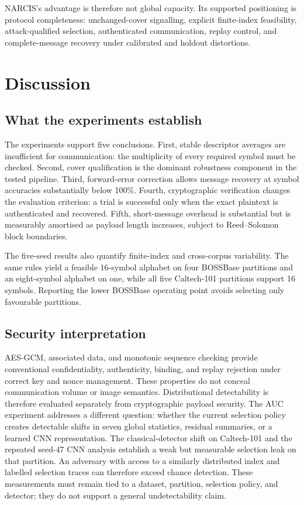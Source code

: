 ﻿\documentclass[a4paper,fleqn]{cas-dc}
\newcommand{\method}{NARCIS\xspace}
\begin{document}
\method's advantage is therefore not global capacity. Its supported
positioning is protocol completeness: unchanged-cover signalling, explicit
finite-index feasibility, attack-qualified selection, authenticated
communication, replay control, and complete-message recovery under calibrated
and holdout distortions.

\FloatBarrier
\section{Discussion}
\label{sec:discussion}

\subsection{What the experiments establish}

The experiments support five conclusions. First, stable descriptor averages
are insufficient for communication: the multiplicity of every required
symbol must be checked. Second, cover qualification is the dominant robustness
component in the tested pipeline. Third, forward-error correction allows
message recovery at symbol accuracies substantially below 100\%. Fourth,
cryptographic verification changes the evaluation criterion: a trial is
successful only when the exact plaintext is authenticated and recovered.
Fifth, short-message overhead is substantial but is measurably amortised as
payload length increases, subject to Reed--Solomon block boundaries.

The five-seed results also quantify finite-index and cross-corpus variability.
The same rules yield a feasible 16-symbol alphabet on four BOSSBase
partitions and an eight-symbol alphabet on one, while all five Caltech-101
partitions support 16 symbols. Reporting the lower BOSSBase operating point
avoids selecting only favourable partitions.

\subsection{Security interpretation}

AES-GCM, associated data, and monotonic sequence checking provide conventional
confidentiality, authenticity, binding, and replay rejection under correct key
and nonce management. These properties do not conceal communication volume or
image semantics. Distributional detectability is therefore evaluated
separately from cryptographic payload security. The AUC experiment addresses
a different question: whether
the current selection policy creates detectable shifts in seven global
statistics, residual summaries, or a learned CNN representation. The
classical-detector shift on Caltech-101 and the repeated seed-47 CNN analysis
establish a weak but measurable selection leak on that partition. An
adversary with access to a similarly distributed index and labelled selection
traces can therefore exceed chance detection. These measurements must remain
tied to a dataset, partition, selection policy, and detector; they do not
support a general undetectability claim.
\end{document}
